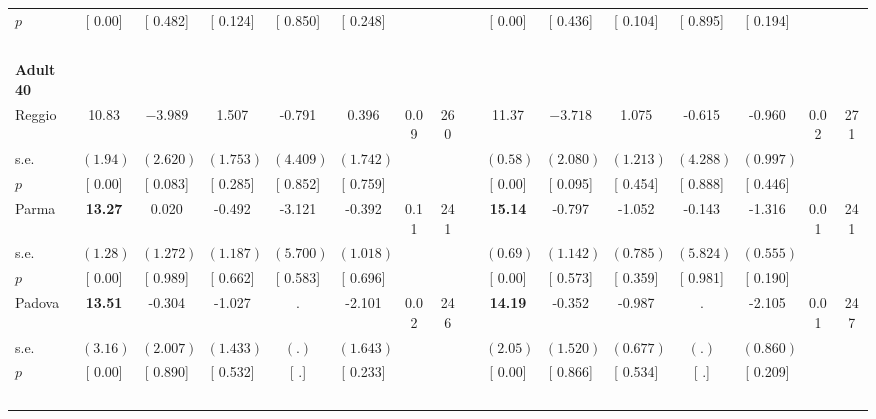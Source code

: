 \begin{longtable}{L{8em} c c c c c c c p{1em} c c c c c c c}
\quad \quad \quad \quad $ p$ & [     0.00] & [    0.482] & [    0.124] & [    0.850] & [    0.248] & & & & [     0.00] & [    0.436] & [    0.104] & [    0.895] & [    0.194] & &  \\[1em]
~\\[1em]
\quad \quad \textbf{Adult 40} & & & & & & & & & & & & & & & \\* 
\quad \quad \quad Reggio& 10.83 & $ \mathbf{   -3.989}$ &     1.507 &    -0.791 &     0.396 &      0.09 &       260 & & 11.37 & $ \mathbf{   -3.718}$ &     1.075 &    -0.615 &    -0.960 &      0.02 &       271  \\*
\quad \quad \quad \quad s.e.& $ (     1.94)$ & $ (    2.620)$ & $ (    1.753)$ & $ (    4.409)$ & $ (    1.742)$ & & & & $ (     0.58)$ & $ (    2.080)$ & $ (    1.213)$ & $ (    4.288)$ & $ (    0.997)$ & &  \\*
\quad \quad \quad \quad $ p$ & [     0.00] & [    0.083] & [    0.285] & [    0.852] & [    0.759] & & & & [     0.00] & [    0.095] & [    0.454] & [    0.888] & [    0.446] & &  \\[1em]
\quad \quad \quad Parma& \textbf{    13.27} &     0.020 &    -0.492 &    -3.121 &    -0.392 &      0.11 &       241 & & \textbf{    15.14} &    -0.797 &    -1.052 &    -0.143 &    -1.316 &      0.01 &       241  \\*
\quad \quad \quad \quad s.e.& $ (     1.28)$ & $ (    1.272)$ & $ (    1.187)$ & $ (    5.700)$ & $ (    1.018)$ & & & & $ (     0.69)$ & $ (    1.142)$ & $ (    0.785)$ & $ (    5.824)$ & $ (    0.555)$ & &  \\*
\quad \quad \quad \quad $ p$ & [     0.00] & [    0.989] & [    0.662] & [    0.583] & [    0.696] & & & & [     0.00] & [    0.573] & [    0.359] & [    0.981] & [    0.190] & &  \\[1em]
\quad \quad \quad Padova& \textbf{    13.51} &    -0.304 &    -1.027 &         . &    -2.101 &      0.02 &       246 & & \textbf{    14.19} &    -0.352 &    -0.987 &         . &    -2.105 &      0.01 &       247  \\*
\quad \quad \quad \quad s.e.& $ (     3.16)$ & $ (    2.007)$ & $ (    1.433)$ & $ (        .)$ & $ (    1.643)$ & & & & $ (     2.05)$ & $ (    1.520)$ & $ (    0.677)$ & $ (        .)$ & $ (    0.860)$ & &  \\*
\quad \quad \quad \quad $ p$ & [     0.00] & [    0.890] & [    0.532] & [        .] & [    0.233] & & & & [     0.00] & [    0.866] & [    0.534] & [        .] & [    0.209] & &  \\[1em]
~\\[1em]

\end{longtable}

